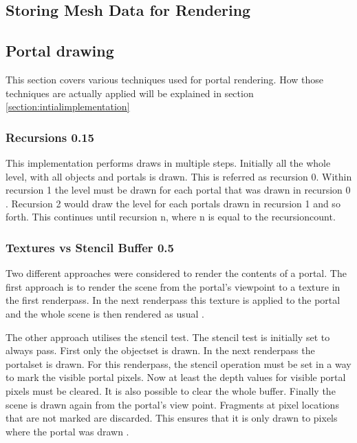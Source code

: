 \subsection{Storing Mesh Data for Rendering}


\subsection{Portal drawing}
\label{section:portaldrawing}

This section covers various techniques used for portal rendering. How those techniques are actually applied will be explained in section \ref{section:intialimplementation}

\subsubsection{Recursions 0.15}


This implementation performs draws in multiple steps. Initially all the whole level, with all objects and portals is drawn. This is referred as recursion 0. Within recursion 1 the level must be drawn for each portal that was drawn in recursion 0 . Recursion 2 would draw the level for each portals drawn in recursion 1 and so forth. This continues until recursion n, where n is equal to the \gls{recursioncount}.


\subsubsection{Textures vs Stencil Buffer 0.5}
\label{section:textursVsStencil}
Two different approaches were considered to render the contents of a portal. The first approach is to render the scene from the portal's viewpoint to a texture in the first renderpass. In the next renderpass this texture is applied to the portal and the whole scene is then rendered as usual \cite{schmalstieg:1999:sewing, lecture:portalProblems}.

The other approach utilises the stencil test. The stencil test is initially set to always pass. First only the \gls{objectset} is drawn. In the next renderpass the \gls{portalset} is drawn. For this renderpass, the stencil operation must be set in a way to mark the visible portal pixels. Now at least the depth values for visible portal pixels must be cleared. It is also possible to clear the whole buffer. Finally the scene is drawn again from the portal's view point. Fragments at pixel locations that are not marked are discarded. This ensures that it is only drawn to pixels where the portal was drawn \cites{schmalstieg:1999:sewing, lowe:2005:technique, lecture:portalProblems}.

